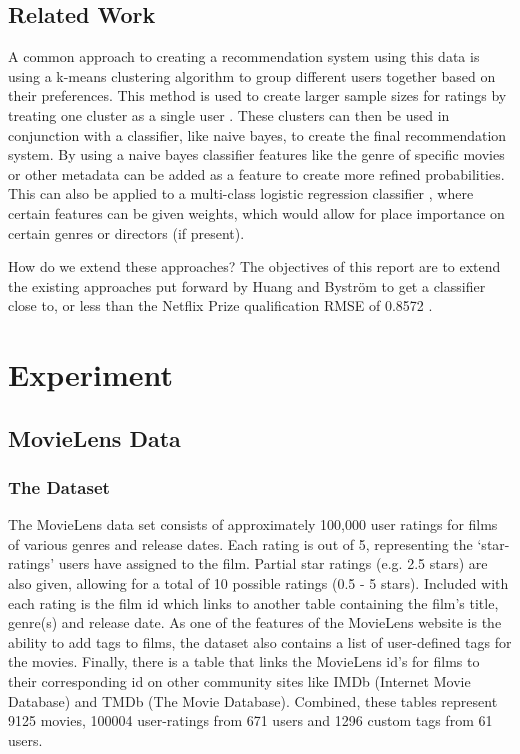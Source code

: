 \documentclass{report}
\begin{document}
	\section{Related Work}
	A common approach to creating a recommendation system using this data is using a k-means clustering algorithm to group different users together based on their preferences. This method is used to create larger sample sizes for ratings by treating one cluster as a single user \autocite{CS229}.
	These clusters can then be used in conjunction with a classifier, like naive bayes, to create the final recommendation system. By using a naive bayes classifier features like the genre of specific movies or other metadata can be added as a feature to create more refined probabilities. This can also be applied to a multi-class logistic regression classifier \autocite{Bystrom}, where certain features can be given weights, which would allow for place importance on certain genres or directors (if present).
	
	
	How do we extend these approaches?
	The objectives of this report are to extend the existing approaches put forward by Huang and Bystr\"om to get a classifier close to, or less than the Netflix Prize qualification RMSE of 0.8572 \autocite{NeflixRules}.

	
	\chapter{Experiment}
	\section{MovieLens Data}
	\subsection{The Dataset}
	The MovieLens data set consists of approximately 100,000 user ratings for films of various genres and release dates. Each rating is out of 5, representing the ‘star-ratings’ users have assigned to the film. Partial star ratings (e.g. 2.5 stars) are also given, allowing for a total of 10 possible ratings (0.5 - 5 stars). Included with each rating is the film id which links to another table containing the film’s title, genre(s) and release date. As one of the features of the MovieLens website is the ability to add tags to films, the dataset also contains a list of user-defined tags for the movies. Finally, there is a table that links the MovieLens id’s for films to their corresponding id on other community sites like IMDb (Internet Movie Database) and TMDb (The Movie Database). Combined, these tables represent 9125 movies, 100004 user-ratings from 671 users and 1296 custom tags from 61 users.
\end{document}
